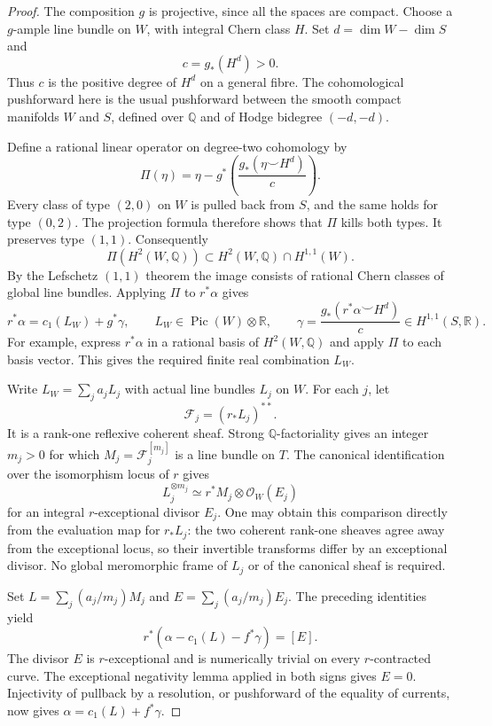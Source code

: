 \begin{proof}
The composition $g$ is projective, since all the spaces are compact.
Choose a $g$-ample line bundle on $W$, with integral Chern class $H$.
Set $d=\dim W-\dim S$ and
\[
                            c=g_*(H^d)>0.
\]
Thus $c$ is the positive degree of $H^d$ on a general fibre. The
cohomological pushforward here is the usual pushforward between the
smooth compact manifolds $W$ and $S$, defined over $\mathbb Q$ and of
Hodge bidegree $(-d,-d)$.

Define a rational linear operator on degree-two cohomology by
\[
 \Pi(\eta)=\eta-g^*\!\left(\frac{g_*(\eta\smile H^d)}{c}\right).
\]
Every class of type $(2,0)$ on $W$ is pulled back from $S$, and the
same holds for type $(0,2)$. The projection formula therefore shows
that $\Pi$ kills both types. It preserves type $(1,1)$. Consequently
\[
        \Pi(H^2(W,\mathbb Q))\subset
                         H^2(W,\mathbb Q)\cap H^{1,1}(W).
\]
By the Lefschetz $(1,1)$ theorem the image consists of rational Chern
classes of global line bundles. Applying $\Pi$ to $r^*\alpha$ gives
\[
 r^*\alpha=c_1(L_W)+g^*\gamma,
 \qquad L_W\in\operatorname{Pic}(W)\otimes\mathbb R,
 \qquad
 \gamma=\frac{g_*(r^*\alpha\smile H^d)}{c}\in H^{1,1}(S,\mathbb R).
\]
For example, express $r^*\alpha$ in a rational basis of $H^2(W,\mathbb Q)$
and apply $\Pi$ to each basis vector. This gives the required finite
real combination $L_W$.

Write $L_W=\sum_j a_jL_j$ with actual line bundles $L_j$ on $W$.
For each $j$, let
\[
                   \mathcal F_j=(r_*L_j)^{**}.
\]
It is a rank-one reflexive coherent sheaf. Strong
$\mathbb Q$-factoriality gives an integer $m_j>0$ for which
$M_j=\mathcal F_j^{[m_j]}$ is a line bundle on $T$.
The canonical identification over the isomorphism locus of $r$ gives
\[
             L_j^{\otimes m_j}\simeq r^*M_j\otimes\mathcal O_W(E_j)
\]
for an integral $r$-exceptional divisor $E_j$.
One may obtain this comparison directly from the evaluation map for
$r_*L_j$: the two coherent rank-one sheaves agree away from the
exceptional locus, so their invertible transforms differ by an
exceptional divisor. No global meromorphic frame of $L_j$ or of the
canonical sheaf is required.

Set $L=\sum_j(a_j/m_j)M_j$ and
$E=\sum_j(a_j/m_j)E_j$. The preceding identities yield
\[
                r^*(\alpha-c_1(L)-f^*\gamma)=[E].
\]
The divisor $E$ is $r$-exceptional and is numerically trivial on every
$r$-contracted curve. The exceptional negativity lemma applied in both
signs gives $E=0$. Injectivity of pullback by a resolution, or pushforward
of the equality of currents, now gives
$\alpha=c_1(L)+f^*\gamma$.
\end{proof}

